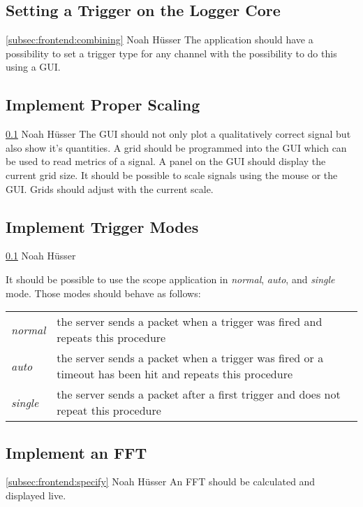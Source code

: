 \documentclass[a4paper,oneside]{alpenspecs/alpenspecs}
\begin{document}
\subsection{Setting a Trigger on the Logger Core}
\label{subsec:frontend:trig}
\wpac
    {}
    {}
    {}
    {\ref{subsec:frontend:combining}}
    {}
    {Noah Hüsser}
    {%
        The application should have a possibility to set a trigger type for any channel with the possibility to do this using a GUI.
    }

\subsection{Implement Proper Scaling}
\label{subsec:frontend:scaling}
\wpac
    {}
    {}
    {}
    {\ref{subsec:frontend:trig}}
    {}
    {Noah Hüsser}
    {%
        The GUI should not only plot a qualitatively correct signal but also show it's quantities.
        A grid should be programmed into the GUI which can be used to read metrics of a signal. A panel on the GUI should display the current grid size.
        It should be possible to scale signals using the mouse or the GUI. Grids should adjust with the current scale.
    }

\subsection{Implement Trigger Modes}
\label{subsec:frontend:modes}
\wpac
    {}
    {}
    {}
    {\ref{subsec:frontend:trig}}
    {}
    {Noah Hüsser}
    {%
        It should be possible to use the scope application in \textit{normal}, \textit{auto}, and \textit{single} mode. Those modes should behave as follows:
        \begin{tabular}{l l}
        \textit{normal} & the server sends a packet when a trigger was fired and repeats this procedure \\
        \textit{auto} & the server sends a packet when a trigger was fired or a timeout has been hit and repeats this procedure \\
        \textit{single} & the server sends a packet after a first trigger and does not repeat this procedure
        \end{tabular}
    }

\subsection{Implement an FFT}
\label{subsec:frontend:fft}
\wpac
    {}
    {}
    {}
    {\ref{subsec:frontend:specify}}
    {}
    {Noah Hüsser}
    {%
        An FFT should be calculated and displayed live.
    }
\end{document}
